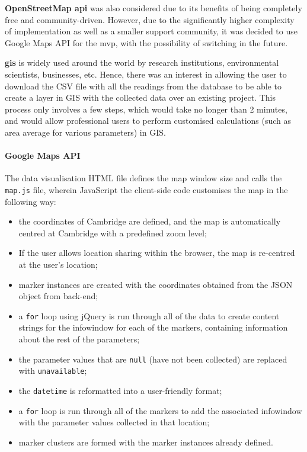 \textbf{OpenStreetMap \gls{api}} was also considered due to its benefits of being completely free and community-driven. However, due to the significantly higher complexity of implementation as well as a smaller support community, it was decided to use Google Maps API for the \gls{mvp}, with the possibility of switching in the future.


\textbf{\gls{gis}} is widely used around the world by research institutions, environmental scientists, businesses, etc. Hence, there was an interest in allowing the user to download the CSV file with all the readings from the database to be able to create a layer in GIS with the collected data over an existing project. This process only involves a few steps, which would take no longer than 2 minutes, and would allow professional users to perform customised calculations (such as area average for various parameters) in GIS.


\paragraph{Google Maps API}

The data visualisation HTML file defines the map window size and calls the \texttt{map.js} file, wherein JavaScript the client-side code customises the map in the following way:
\begin{itemize}
    \item the coordinates of Cambridge are defined, and the map is automatically centred at Cambridge with a predefined zoom level;
    \item If the user allows location sharing within the browser, the map is re-centred at the user's location;
    \item marker instances are created with the coordinates obtained from the JSON object from back-end;
    \item a \texttt{for} loop using jQuery is run through all of the data to create content strings for the infowindow for each of the markers, containing information about the rest of the parameters;
    \item the parameter values that are \texttt{null} (have not been collected) are replaced with \texttt{unavailable};
    \item the \texttt{datetime} is reformatted into a user-friendly format;
    \item a \texttt{for} loop is run through all of the markers to add the associated infowindow with the parameter values collected in that location;
    \item marker clusters are formed with the marker instances already defined.
\end{itemize}\text{}\\


